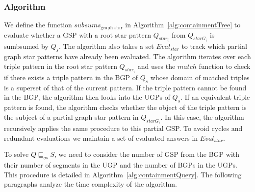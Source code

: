 \subsubsection{Algorithm}



We define the function $subsums_{\text{graph star}}$ in Algorithm~\ref{alg:containmentTree} to evaluate whether a GSP with a root star pattern $Q_{star_i}$ from $Q_{starG_i}$ is sumbsumed by $Q_s$. 
The algorithm also takes a set $Eval_{star}$ to track which partial graph star patterns have already been evaluated.
The algorithm iterates over each triple pattern in the root star pattern $Q_{star_i}$ and uses the $match$ function to check if there exists a triple pattern in the BGP of $Q_s$ whose domain of matched triples is a superset of that of the current pattern.
If the triple pattern cannot be found in the BGP, the algorithm then looks into the UGPs of $Q_s$. 
If an equivalent triple pattern is found, the algorithm checks whether the object of the triple pattern is the subject of a partial graph star pattern in $Q_{starG_i}$.
In this case, the algorithm recursively applies the same procedure to this partial GSP.
To avoid cycles and redundant evaluations we maintain a set of evaluated answers in $Eval_{star}$.
\iffalse
We notice that the complexity of Algorithm~\ref{alg:containmentTree} is $O(n_{tp}^2 \cdot n_{sunion})$
where $n_{tp}$ is the number of triple patterns of $Q_{starG_i}$ and $n_{sunion}$ the number of UGP in $Q_s$.
\fi
To solve $Q \sqsubseteq_{qs} S$, we need to consider the number of GSP from the BGP with their number of segments in the UGP and the number of BGPs in the UGPs.
This procedure is detailed in Algorithm~\ref{alg:containmentQuery}.
The following paragraphs analyze the time complexity of the algorithm.


